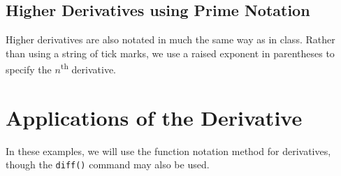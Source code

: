 \begin{maplegroup}
\begin{mapleinput}
\end{mapleinput}
\mapleresult
\begin{maplelatex}
\end{maplelatex}
\end{maplegroup}


\subsection{Higher Derivatives using Prime Notation}

Higher derivatives are also notated in much the same way as in class. Rather than using a string of tick marks, we use a raised exponent in parentheses to specify the $n$\textsuperscript{th} derivative.
\begin{maplegroup}
\begin{mapleinput}
\end{mapleinput}
\mapleresult
\begin{maplelatex}
\end{maplelatex}
\end{maplegroup}

\begin{maplegroup}
\begin{mapleinput}
\end{mapleinput}
\mapleresult
\begin{maplelatex}
\end{maplelatex}
\end{maplegroup}

\section{Applications of the Derivative}

In these examples, we will use the function notation method for derivatives, though the \texttt{diff()} command may also be used.

